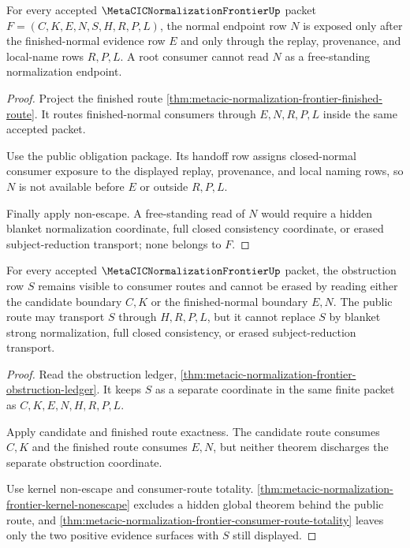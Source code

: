 \begin{theorem}
\label{thm:metacic-normalization-frontier-root-normal-endpoint-handoff}
For every accepted $\MetaCICNormalizationFrontierUp$ packet
$F=(C,K,E,N,S,H,R,P,L)$, the normal endpoint row $N$ is exposed only after the
finished-normal evidence row $E$ and only through the replay, provenance, and
local-name rows $R,P,L$. A root consumer cannot read $N$ as a free-standing
normalization endpoint.
\end{theorem}
\begin{proof}
Project the finished route
\autoref{thm:metacic-normalization-frontier-finished-route}. It routes
finished-normal consumers through $E,N,R,P,L$ inside the same accepted packet.

Use the public obligation package. Its handoff row assigns closed-normal
consumer exposure to the displayed replay, provenance, and local naming rows,
so $N$ is not available before $E$ or outside $R,P,L$.

Finally apply non-escape. A free-standing read of $N$ would require a hidden
blanket normalization coordinate, full closed consistency coordinate, or
erased subject-reduction transport; none belongs to $F$.
\end{proof}

\begin{theorem}
\label{thm:metacic-normalization-frontier-obstruction-consumer-lock}
For every accepted $\MetaCICNormalizationFrontierUp$ packet, the obstruction
row $S$ remains visible to consumer routes and cannot be erased by reading
either the candidate boundary $C,K$ or the finished-normal boundary $E,N$.
The public route may transport $S$ through $H,R,P,L$, but it cannot replace
$S$ by blanket strong normalization, full closed consistency, or erased
subject-reduction transport.
\end{theorem}
\begin{proof}
Read the obstruction ledger,
\autoref{thm:metacic-normalization-frontier-obstruction-ledger}. It keeps
$S$ as a separate coordinate in the same finite packet as $C,K,E,N,H,R,P,L$.

Apply candidate and finished route exactness. The candidate route consumes
$C,K$ and the finished route consumes $E,N$, but neither theorem discharges
the separate obstruction coordinate.

Use kernel non-escape and consumer-route totality.
\autoref{thm:metacic-normalization-frontier-kernel-nonescape} excludes a
hidden global theorem behind the public route, and
\autoref{thm:metacic-normalization-frontier-consumer-route-totality} leaves
only the two positive evidence surfaces with $S$ still displayed.
\end{proof}

